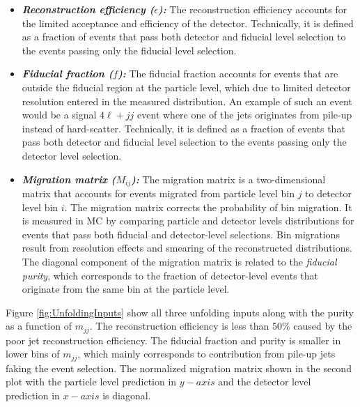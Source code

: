 \begin{itemize}
    \item{\textit{\textbf{Reconstruction efficiency ($\epsilon$):}} The reconstruction efficiency accounts for the limited acceptance and efficiency of the detector. Technically, it is defined as a fraction of events that pass both detector and fiducial level selection to the events passing only the fiducial level selection. }
    
    \item{\textit{\textbf{Fiducial fraction ($f$):}} The fiducial fraction accounts for events that are outside the fiducial region at the particle level, which due to limited detector resolution entered in the measured distribution. An example of such an event would be a signal $4\ell+jj$ event where one of the jets originates from pile-up instead of hard-scatter. Technically, it is defined as a fraction of events that pass both detector and fiducial level selection to the events passing only the detector level selection. }
    
    \item{\textit{\textbf{Migration matrix ($M_{ij}$):}} The migration matrix is a two-dimensional matrix that accounts for events migrated from particle level bin $j$ to detector level bin $i$. The migration matrix corrects the probability of bin migration. It is measured in MC by comparing particle and detector levels distributions for events that pass both fiducial and detector-level selections. Bin migrations result from resolution effects and smearing of the reconstructed distributions. The diagonal component of the migration matrix is related to the \textit{fiducial purity}, which corresponds to the fraction of detector-level events that originate from the same bin at the particle level.}
\end{itemize}

Figure \ref{fig:UnfoldingInputs} show all three unfolding inputs along with the purity as a function of $m_{jj}$. The reconstruction efficiency is less than $50\%$ caused by the poor jet reconstruction efficiency. The fiducial fraction and purity is smaller in lower bins of $m_{jj}$, which mainly corresponds to contribution from pile-up jets faking the event selection. The normalized migration matrix shown in the second plot with the particle level prediction in $y-axis$ and the detector level prediction in $x-axis$ is diagonal.

